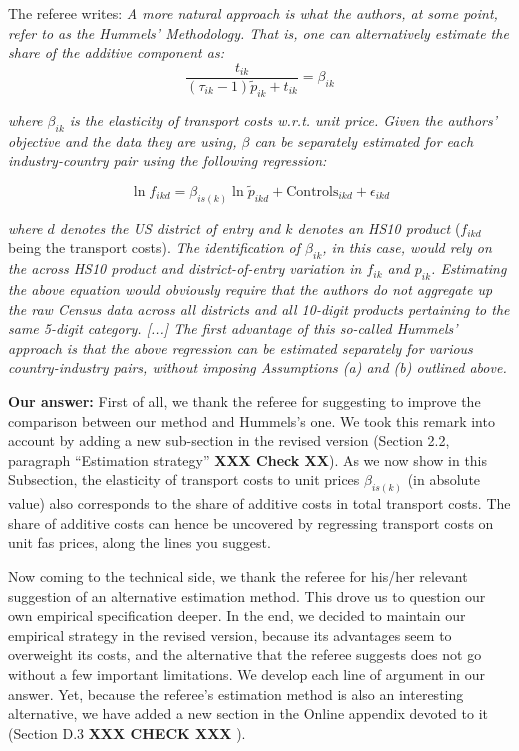 \documentclass[a4paper,11pt]{article}
\begin{document}
The referee writes: \textit{A more natural approach is what the authors, at some point, refer to as the Hummels' Methodology. That is, one can alternatively estimate the share of the additive component as:}
$$\frac{t_{ik}}{ (\tau_{ik}-1)\tilde{p}_{ik} + t_{ik}} = \beta_{ik}$$

\textit{where $\beta_{ik}$ is the elasticity of transport costs w.r.t. unit price. Given the authors' objective and the data they are using, $\beta$ can be separately estimated for each industry-country pair using the following regression:}

\begin{equation}
\ln f_{ikd} = \beta_{is(k)}\ln \tilde{p}_{ikd} + \text{Controls}_{ikd} +\epsilon_{ikd} \label{eq:estimation_ref1}
\end{equation}

\textit{where $d$ denotes the US district of entry and $k$ denotes an HS10 product} ($f_{ikd}$ being the transport costs). \textit{The
identification of $\beta_{ik}$, in this case, would rely on the across HS10 product and
district-of-entry variation in $f_{ik}$ and $p_{ik}$. Estimating the above equation would
obviously require that the authors do not aggregate up the raw Census data
across all districts and all 10-digit products pertaining to the same 5-digit category. [...] The first advantage of this so-called Hummels' approach is that the above regression can be estimated separately for various country-industry pairs, without imposing Assumptions (a) and (b) outlined above.}

\textbf{Our answer:} First of all, we thank the referee for suggesting to improve the comparison between our method and Hummels's one. We took this remark into account by adding a new sub-section in the revised version (Section 2.2, paragraph ``Estimation strategy'' \textbf{XXX Check XX}). As we now show in this Subsection, the elasticity of transport costs to unit prices $\beta_{is(k)}$ (in absolute value) also corresponds to the share of additive costs in total transport costs. The share of additive costs can hence be uncovered by regressing transport costs on unit fas prices, along the lines you suggest.

Now coming to the technical side, we thank the referee for his/her relevant suggestion of an alternative estimation method. This drove us to question our own empirical specification deeper. In the end, we decided to maintain our empirical strategy in the revised version, because its advantages seem to overweight its costs, and the alternative that the referee suggests does not go without a few important limitations. We develop each line of argument in our answer. Yet, because the referee's estimation method is also an interesting alternative, we have added a new section in the Online appendix devoted to it (Section D.3 \textbf{XXX CHECK XXX }).
\end{document}
